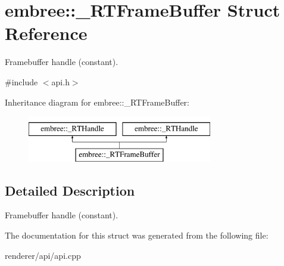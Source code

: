 \hypertarget{structembree_1_1___r_t_frame_buffer}{
\section{embree::\_\-RTFrameBuffer Struct Reference}
\label{structembree_1_1___r_t_frame_buffer}
}


Framebuffer handle (constant).  




{\ttfamily \#include $<$api.h$>$}

Inheritance diagram for embree::\_\-RTFrameBuffer:\begin{figure}[H]
\begin{center}
\leavevmode
\includegraphics[height=2.000000cm]{structembree_1_1___r_t_frame_buffer}
\end{center}
\end{figure}


\subsection{Detailed Description}
Framebuffer handle (constant). 

The documentation for this struct was generated from the following file:\begin{DoxyCompactItemize}
\item 
renderer/api/api.cpp\end{DoxyCompactItemize}
